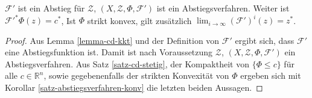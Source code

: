 \begin{korollar}
	\label{korollar-cd-convergency}
	$\mathcal{F}'$ ist ein Abstieg für $\mathcal{Z}$, $(X,\mathcal{Z}, \Phi, \mathcal{F}')$ ist ein Abstiegsverfahren. Weiter ist $\mathcal{F}'^*\Phi(z) = c^*$, Ist $\Phi$ strikt konvex, gilt zusätzlich $\lim_{i \rightarrow \infty} (\mathcal{F}')^i(z) = z^*$.
\end{korollar}
\begin{proof}
	Aus Lemma \ref{lemma-cd-kkt} und der Definition von $\mathcal{F}'$ ergibt sich, dass $\mathcal{F}'$ eine Abstiegsfunktion ist. Damit ist nach Voraussetzung $\mathcal{Z}$, $(X,\mathcal{Z}, \Phi, \mathcal{F}')$ ein Abstiegsverfahren. Aus Satz \ref{satz-cd-stetig}, der Kompaktheit von $\{ \Phi \leq c \}$ für alle $c \in \mathbb{R}^n$, sowie gegebenenfalls der strikten Konvexität von $\Phi$ ergeben sich mit Korollar \ref{satz-abstiegsverfahren-konv} die letzten beiden Aussagen.
\end{proof}